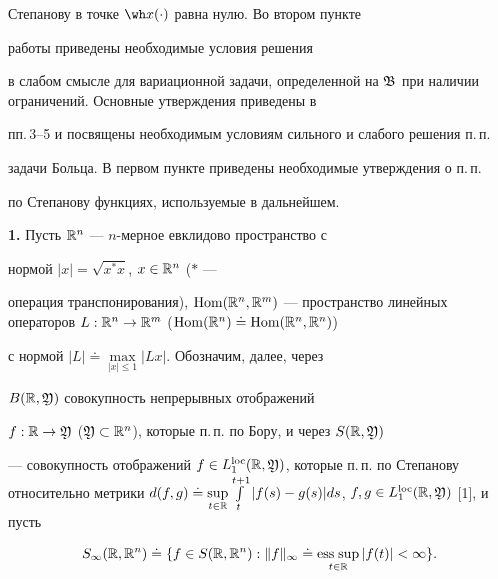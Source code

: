 Степанову в точке $\wh x(\cdot)$ равна нулю. Во втором пункте


работы приведены необходимые условия решения


в слабом смысле для вариационной задачи, определенной на ${\frak


B}$ при наличии ограничений. Основные утверждения приведены в 


пп.\,3--5 и посвящены необходимым условиям сильного и слабого решения п.\,п.


задачи Больца. В первом пункте приведены необходимые утверждения о п.\,п.


по Степанову функциях, используемые в дальнейшем.


\medskip





{\bf 1.} Пусть $\Bbb R^n$ --- $n$-мерное евклидово пространство с


нормой $|x|=\sqrt{x^* x}$, $x\in{\Bbb R}^n$ ($\ast$ --- 


операция транспонирования), $\Hom(\Bbb R^n,\Bbb


R^m)$ --- пространство линейных операторов $L:\Bbb


R^n\to\Bbb R^m$ ($\Hom(\Bbb R^n)\doteq \Hom(\Bbb R^n,{\Bbb R}^n)$)


с нормой $|L|\doteq \max\limits_{|x|\leqslant 1}|Lx|$. Обозначим, далее, через


$B(\Bbb R,\frak Y)$ совокупность непрерывных отображений


$f:\Bbb R\to\frak Y$ ($\frak Y\subset\Bbb


R^n$), которые п.\,п. по Бору, и через $S(\Bbb R,\frak Y)$


--- совокупность отображений $f\in L_1^{\loc}(\Bbb R,\frak


Y)$, которые п.\,п. по Степанову относительно метрики $d(f,g)\doteq


\sup\limits_{t\in\Bbb R}\int\limits_t^{t+1}|f(s)-g(s)|ds$, $f, g\in


L_1^{\loc}(\Bbb R,\frak Y)$ [1], и пусть


\begin{equation}


S_{\infty}(\Bbb R,\Bbb R^n)\doteq \{f\in S(\Bbb


R,\Bbb R^n):\|f\|_\infty\doteq


\esssup_{t\in\Bbb R}|f(t)|<\infty\}.


\end{equation}





